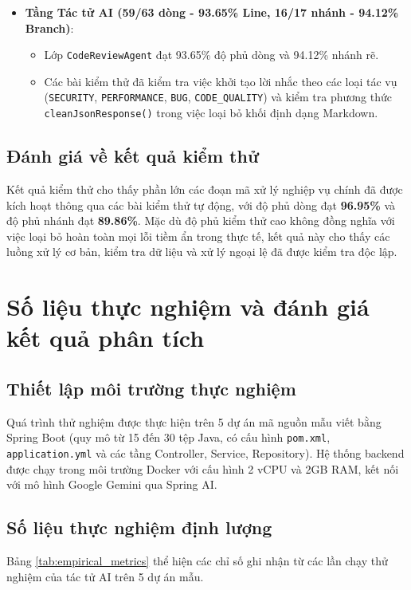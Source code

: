 \documentclass[12pt,a4paper]{report}
\begin{document}
\begin{itemize}
    \item \textbf{Tầng Tác tử AI (59/63 dòng - 93.65\% Line, 16/17 nhánh - 94.12\% Branch)}:
    \begin{itemize}
        \item Lớp \texttt{CodeReviewAgent} đạt 93.65\% độ phủ dòng và 94.12\% nhánh rẽ.
        \item Các bài kiểm thử đã kiểm tra việc khởi tạo lời nhắc theo các loại tác vụ (\texttt{SECURITY}, \texttt{PERFORMANCE}, \texttt{BUG}, \texttt{CODE\_QUALITY}) và kiểm tra phương thức \texttt{cleanJsonResponse()} trong việc loại bỏ khối định dạng Markdown.
    \end{itemize}
\end{itemize}

\subsection{Đánh giá về kết quả kiểm thử}
Kết quả kiểm thử cho thấy phần lớn các đoạn mã xử lý nghiệp vụ chính đã được kích hoạt thông qua các bài kiểm thử tự động, với độ phủ dòng đạt \textbf{96.95\%} và độ phủ nhánh đạt \textbf{89.86\%}. Mặc dù độ phủ kiểm thử cao không đồng nghĩa với việc loại bỏ hoàn toàn mọi lỗi tiềm ẩn trong thực tế, kết quả này cho thấy các luồng xử lý cơ bản, kiểm tra dữ liệu và xử lý ngoại lệ đã được kiểm tra độc lập.

\section{Số liệu thực nghiệm và đánh giá kết quả phân tích}

\subsection{Thiết lập môi trường thực nghiệm}
Quá trình thử nghiệm được thực hiện trên 5 dự án mã nguồn mẫu viết bằng Spring Boot (quy mô từ 15 đến 30 tệp Java, có cấu hình \texttt{pom.xml}, \texttt{application.yml} và các tầng Controller, Service, Repository). Hệ thống backend được chạy trong môi trường Docker với cấu hình 2 vCPU và 2GB RAM, kết nối với mô hình Google Gemini qua Spring AI.

\subsection{Số liệu thực nghiệm định lượng}
Bảng \ref{tab:empirical_metrics} thể hiện các chỉ số ghi nhận từ các lần chạy thử nghiệm của tác tử AI trên 5 dự án mẫu.
\end{document}
